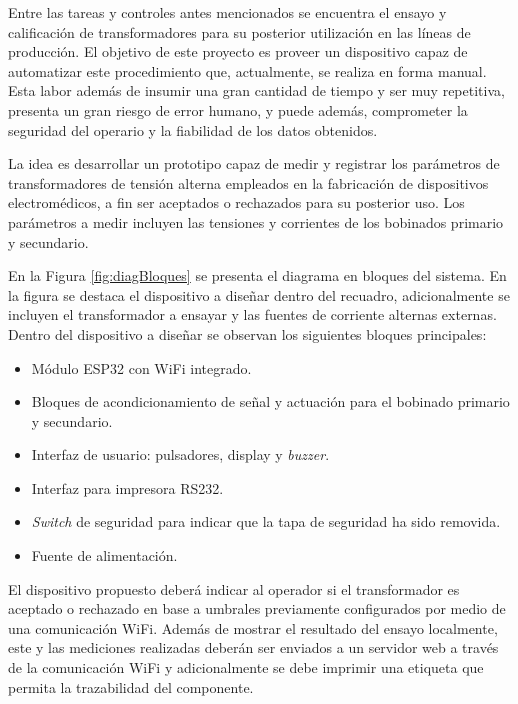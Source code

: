 \documentclass[11pt]{charter}
\begin{document}
Entre las tareas y controles antes mencionados se encuentra el ensayo y calificación de  transformadores para su posterior utilización en las líneas de producción. El objetivo de este proyecto es proveer un dispositivo capaz de automatizar este procedimiento que, actualmente, se realiza en forma manual. Esta labor además de insumir una gran cantidad de tiempo y ser muy repetitiva, presenta un gran riesgo de error humano, y puede además, comprometer la seguridad del operario y la fiabilidad de los datos obtenidos.

La idea es desarrollar un prototipo capaz de medir y registrar los parámetros de transformadores de tensión alterna empleados en la fabricación de dispositivos electromédicos, a fin ser aceptados o rechazados para su posterior uso. Los parámetros a medir incluyen las tensiones y corrientes de los bobinados primario y secundario.

En la Figura \ref{fig:diagBloques} se presenta el diagrama en bloques del sistema. En la figura se destaca el dispositivo a diseñar dentro del recuadro, adicionalmente se incluyen el transformador a ensayar y las fuentes de corriente alternas externas. Dentro del dispositivo a diseñar se observan los siguientes bloques principales:

\begin{itemize}
\item Módulo ESP32 con WiFi integrado.
\item Bloques de acondicionamiento de señal y actuación para el bobinado primario y secundario.
\item Interfaz de usuario: pulsadores, display y \textit{buzzer}.
\item Interfaz para impresora RS232.
\item \textit{Switch} de seguridad para indicar que la tapa de seguridad ha sido removida.
\item Fuente de alimentación.
\end{itemize}

El dispositivo propuesto deberá indicar al operador si el transformador es aceptado o rechazado en base a umbrales previamente configurados por medio de una comunicación WiFi. Además de mostrar el resultado del ensayo localmente, este y las mediciones realizadas deberán ser enviados a un servidor web a través de la comunicación WiFi y adicionalmente se debe imprimir una etiqueta que permita la trazabilidad del componente.
\end{document}
